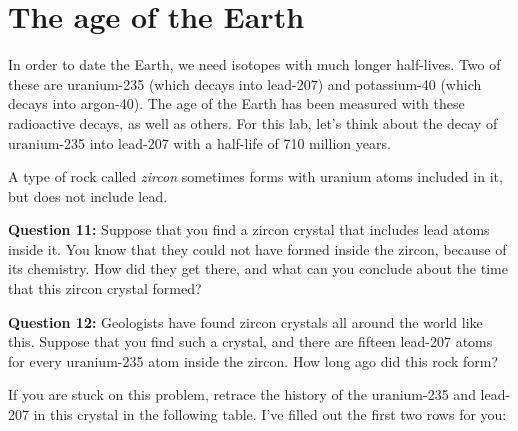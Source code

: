 \documentclass[11pt]{article}
\begin{document}
\vspace{2in}

\section{The age of the Earth}

In order to date the Earth, we need isotopes with much longer half-lives. Two of these are uranium-235 (which decays into lead-207) and potassium-40 (which decays into argon-40). The age of the Earth has been measured with these radioactive decays,
as well as others. For this lab, let's think about the decay of uranium-235 into lead-207 with a half-life of 710 million years.

A type of rock called {\it zircon} sometimes forms with uranium atoms included in it, but does not include lead. 

{\bf Question 11:} Suppose that you find a zircon crystal that includes lead atoms inside it. You know that they could not have formed inside the zircon, because of its chemistry. 
How did they get there, and what can you conclude about the time that this zircon crystal formed?

\vspace{2in}

\newpage
{\bf Question 12:}
Geologists have found zircon crystals all around the world like this. Suppose that you find such a crystal, and there are fifteen lead-207 atoms for every uranium-235 atom inside the zircon. How long ago
did this rock form? 

If you are stuck on this problem, retrace the history of the uranium-235 and lead-207 in this crystal in the following table. I've filled out the first two rows for you:
\end{document}
